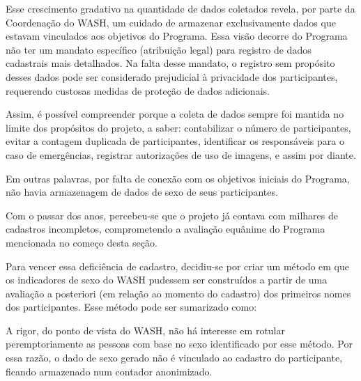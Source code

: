 Esse crescimento gradativo na quantidade de dados coletados revela, por parte da Coordenação do WASH, um cuidado de armazenar exclusivamente dados que estavam vinculados aos objetivos do Programa. Essa visão decorre do Programa não ter um mandato específico (atribuição legal) para registro de dados cadastrais mais detalhados. Na falta desse mandato, o registro sem propósito desses dados pode ser considerado prejudicial à privacidade dos participantes, requerendo custosas medidas de proteção de dados adicionais.

Assim, é possível compreender porque a coleta de dados sempre foi mantida no limite dos propósitos do projeto, a saber: contabilizar o número de participantes, evitar a contagem duplicada de participantes, identificar os responsáveis para o caso de emergências, registrar autorizações de uso de imagens, e assim por diante.

Em outras palavras, por falta de conexão com os objetivos iniciais do Programa, não havia armazenagem de dados de sexo de seus participantes.

Com o passar dos anos, percebeu-se que o projeto já contava com milhares de cadastros incompletos, comprometendo a avaliação equânime do Programa mencionada no começo desta seção.

Para vencer essa deficiência de cadastro, decidiu-se por criar um método em que os indicadores de sexo do WASH pudessem ser construídos a partir de uma avaliação a posteriori (em relação ao momento do cadastro) dos primeiros nomes dos participantes. Esse método pode ser sumarizado como:


\noindent\begin{flushright}\mbox{\linespread{1}\selectfont\centering{}}\end{flushright}


A rigor, do ponto de vista do WASH, não há interesse em rotular peremptoriamente as pessoas com base no sexo identificado por esse método. Por essa razão, o dado de sexo gerado não é vinculado ao cadastro do participante, ficando armazenado num contador anonimizado.

